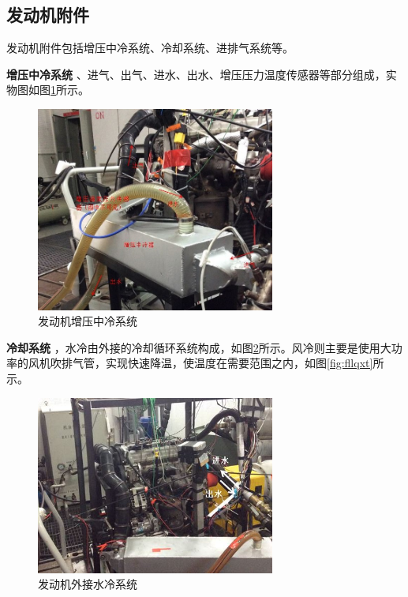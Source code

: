 \subsection{发动机附件}
发动机附件包括增压中冷系统、冷却系统、进排气系统等。
\par\textbf{增压中冷系统}
、进气、出气、进水、出水、增压压力温度传感器等部分组成，实物图如图\ref{fig:zyzlq}所示。
\begin{figure}[H]
	\centering
	\includegraphics[width=0.7\textwidth]{thesis_figure/platformer_chapter/zyzlq}
	\caption{发动机增压中冷系统}
	\label{fig:zyzlq}
\end{figure}
\par\textbf{冷却系统}
，水冷由外接的冷却循环系统构成，如图\ref{fig:sllqxt}所示。风冷则主要是使用大功
率的风机吹排气管，实现快速降温，使温度在需要范围之内，如图\ref{fig:fllqxt}所示。
\begin{figure}[H]
	\centering
	\includegraphics[width=0.7\textwidth]{thesis_figure/platformer_chapter/sllqxt}
	\caption{发动机外接水冷系统}
	\label{fig:sllqxt}
\end{figure}
